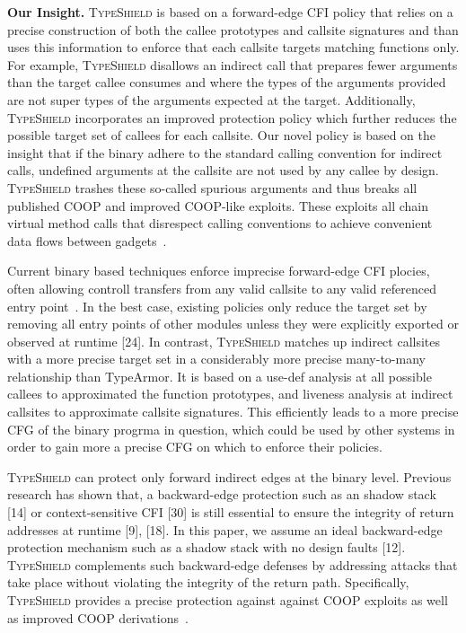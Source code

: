 \textbf{Our Insight.} \textsc{TypeShield} is based on a forward-edge CFI policy that 
relies on a precise construction of both the callee prototypes and callsite signatures
and than uses this information to enforce that each callsite targets matching functions 
only. For example, \textsc{TypeShield} disallows an indirect call that prepares
fewer arguments than the target callee consumes and where the types of the 
arguments provided are not super types of the arguments expected at the target.
Additionally, \textsc{TypeShield} incorporates an improved protection policy
which further reduces the possible target set of callees for each callsite.
Our novel policy is based on the insight that if the binary adhere to the standard calling convention
for indirect calls, undefined arguments at the callsite are not used by
any callee by design. \textsc{TypeShield} trashes these so-called
spurious arguments and thus breaks all published COOP
and improved COOP-like exploits. These exploits all chain
virtual method calls that disrespect calling conventions to
achieve convenient data flows between gadgets~\cite{crane:readactor++}.

Current binary based techniques enforce imprecise forward-edge CFI 
plocies, often allowing controll transfers from any valid callsite 
to any valid referenced entry point~\cite{ccfir:zhang, zhang:usenix}. 
In the best case, existing policies only reduce the target set by
removing all entry points of other modules unless they were
explicitly exported or observed at runtime [24]. 
In contrast, \textsc{TypeShield} matches up indirect callsites with a more precise
target set in a considerably more precise many-to-many relationship than TypeArmor.
It is based on a use-def analysis at all possible callees to approximated the function prototypes, 
and liveness analysis at indirect callsites to approximate callsite signatures. This 
efficiently leads to a more precise CFG of the binary progrma in question, 
which could be used by other systems in order to gain more a precise CFG on which to 
enforce their policies.

\textsc{TypeShield} can protect only forward indirect edges at the binary level.
Previous research has shown that, a backward-edge protection 
such as an shadow stack [14] or context-sensitive
CFI [30] is still essential to ensure the integrity of return addresses at 
runtime [9], [18]. In this paper, we assume an ideal
backward-edge protection mechanism such as a shadow
stack with no design faults [12]. 
\textsc{TypeShield} complements such backward-edge defenses by addressing
attacks that take place without violating the integrity of the return path.
Specifically, \textsc{TypeShield} provides a precise protection 
against against COOP exploits as well as improved COOP 
derivations~\cite{crane:readactor++, subversive-c:lettner, ctf:coop, loop:oriented}.

